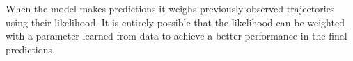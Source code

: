 When the model makes predictions it weighs previously observed trajectories using their likelihood. It is entirely possible that the likelihood can be weighted with a parameter learned from data to achieve a better performance in the final predictions.


